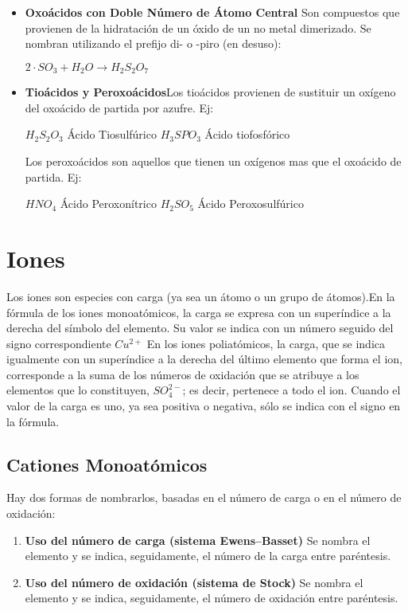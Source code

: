 \begin{itemize}
	\item \textbf{Oxoácidos con Doble Número de Átomo Central} Son compuestos que provienen de la hidratación de un óxido de un no metal dimerizado. Se nombran utilizando el prefijo di- o -piro (en desuso):
	\begin{center}
		$2\cdot SO_3 + H_{2}O \rightarrow H_{2}S_{2}O_{7}$
	\end{center}
	\item \textbf{Tioácidos y Peroxoácidos}Los tioácidos provienen de sustituir un oxígeno del oxoácido de partida por azufre. Ej:
	\begin{center}
		$H_{2}S_{2}O_{3}$   Ácido Tiosulfúrico \hspace{1cm} $H_{3}SPO_3$ Ácido tiofosfórico
	\end{center}
	Los peroxoácidos son aquellos que tienen un oxígenos mas que el oxoácido de partida. Ej:
	\begin{center}
		$HNO_4$    Ácido Peroxonítrico \hspace{1cm} $H_{2}SO_5$   Ácido Peroxosulfúrico
	\end{center}
	
\end{itemize}

\section{Iones}
Los iones son especies con carga (ya sea un átomo o un grupo de átomos).En la fórmula de los iones monoatómicos, la carga se expresa con un superíndice a la derecha del símbolo del elemento. Su valor se indica con un número seguido del signo correspondiente $Cu^{2+}$ En los iones poliatómicos, la carga, que se indica igualmente con un superíndice a la derecha del último elemento que forma el ion, corresponde a la suma de los números de oxidación que se atribuye a los elementos que lo constituyen, $SO_{4}^{2-}$; es decir, pertenece a todo el ion. Cuando el valor de la carga es uno, ya sea positiva o negativa, sólo se indica con el signo en la fórmula.

\subsection{Cationes Monoatómicos}
Hay dos formas de nombrarlos, basadas en el número de carga o en el número de oxidación:\\
\begin{enumerate}
	
	\item \textbf{Uso del número de carga (sistema Ewens–Basset)} Se nombra el elemento y se indica, seguidamente, el número de la carga entre paréntesis.
	
	\item \textbf{Uso del número de oxidación (sistema de Stock)} Se nombra el elemento y se indica, seguidamente, el número de oxidación entre paréntesis.

\end{enumerate}

